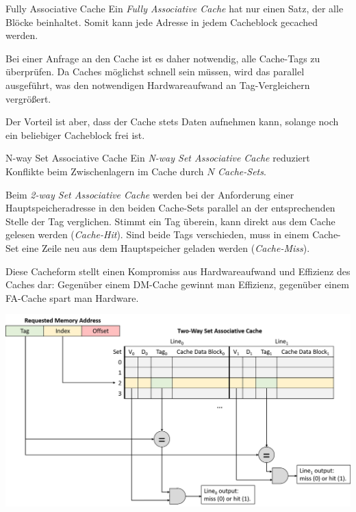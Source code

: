 \begin{defi}{Fully Associative Cache}
    Ein \emph{Fully Associative Cache} hat nur einen Satz, der alle Blöcke beinhaltet.
    Somit kann jede Adresse in jedem Cacheblock gecached werden.
    
    Bei einer Anfrage an den Cache ist es daher notwendig, alle Cache-Tags zu überprüfen.
    Da Caches möglichst schnell sein müssen, wird das parallel ausgeführt, was den notwendigen Hardwareaufwand an Tag-Vergleichern vergrößert.
    
    Der Vorteil ist aber, dass der Cache stets Daten aufnehmen kann, solange noch ein beliebiger Cacheblock frei ist.
\end{defi}

\begin{defi}{N-way Set Associative Cache}
    Ein \emph{N-way Set Associative Cache} reduziert Konflikte beim Zwischenlagern im Cache durch $N$ \emph{Cache-Sets}.
    
    Beim \emph{2-way Set Associative Cache} werden bei der Anforderung einer Hauptspeicheradresse in den beiden Cache-Sets parallel an der entsprechenden Stelle der Tag verglichen.
    Stimmt ein Tag überein, kann direkt aus dem Cache gelesen werden (\emph{Cache-Hit}).
    Sind beide Tags verschieden, muss in einem Cache-Set eine Zeile neu aus dem Hauptspeicher geladen werden (\emph{Cache-Miss}).
    
    Diese Cacheform stellt einen Kompromiss aus Hardwareaufwand und Effizienz des Caches dar:
    Gegenüber einem DM-Cache gewinnt man Effizienz, gegenüber einem FA-Cache spart man Hardware.
    
    \centering
    \includegraphics[width=.9\linewidth]{images/2-way_set_associative_cache_request.png}
\end{defi}

